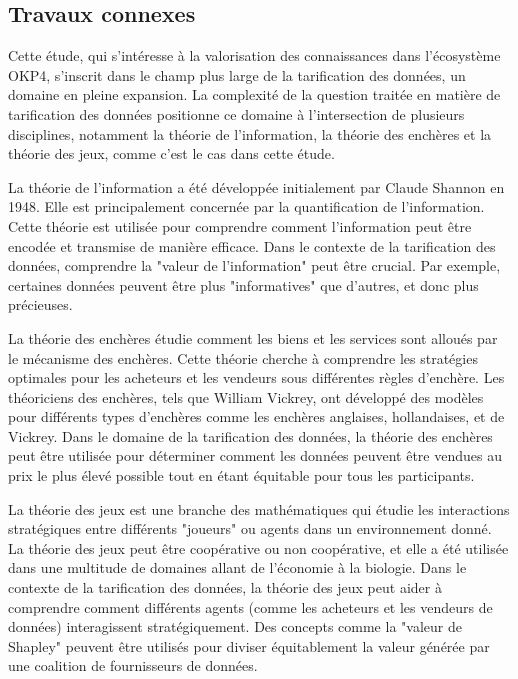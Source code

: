 \subsection{Travaux connexes}\label{subsec:travaux_connexes}

Cette étude, qui s'intéresse à la valorisation des connaissances dans l'écosystème OKP4, s'inscrit dans le champ plus large de la tarification des données, un domaine en pleine expansion. La complexité de la question traitée en matière de tarification des données positionne ce domaine à l'intersection de plusieurs disciplines, notamment la théorie de l'information, la théorie des enchères et la théorie des jeux, comme c'est le cas dans cette étude.

La théorie de l'information a été développée initialement par Claude Shannon en 1948. Elle est principalement concernée par la quantification de l'information. Cette théorie est utilisée pour comprendre comment l'information peut être encodée et transmise de manière efficace. Dans le contexte de la tarification des données, comprendre la "valeur de l'information" peut être crucial. Par exemple, certaines données peuvent être plus "informatives" que d'autres, et donc plus précieuses.

La théorie des enchères étudie comment les biens et les services sont alloués par le mécanisme des enchères. Cette théorie cherche à comprendre les stratégies optimales pour les acheteurs et les vendeurs sous différentes règles d'enchère. Les théoriciens des enchères, tels que William Vickrey, ont développé des modèles pour différents types d'enchères comme les enchères anglaises, hollandaises, et de Vickrey. Dans le domaine de la tarification des données, la théorie des enchères peut être utilisée pour déterminer comment les données peuvent être vendues au prix le plus élevé possible tout en étant équitable pour tous les participants.

La théorie des jeux est une branche des mathématiques qui étudie les interactions stratégiques entre différents "joueurs" ou agents dans un environnement donné. La théorie des jeux peut être coopérative ou non coopérative, et elle a été utilisée dans une multitude de domaines allant de l'économie à la biologie. Dans le contexte de la tarification des données, la théorie des jeux peut aider à comprendre comment différents agents (comme les acheteurs et les vendeurs de données) interagissent stratégiquement. Des concepts comme la "valeur de Shapley" peuvent être utilisés pour diviser équitablement la valeur générée par une coalition de fournisseurs de données.


